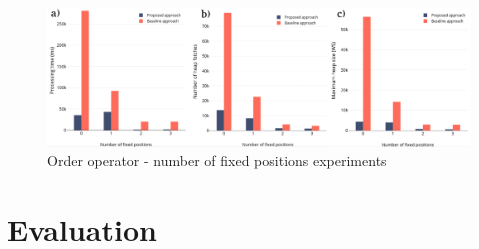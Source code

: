 \begin{figure}[H]
	\includegraphics[scale=0.25]{images/order.png}
	\centering
	\caption{Order operator - number of fixed positions experiments}
	\label{fig:order}
\end{figure}

\section{Evaluation}
\label{sec:eval}


